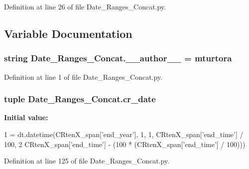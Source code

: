 Definition at line 26 of file Date\+\_\+\+Ranges\+\_\+\+Concat.\+py.



\subsection{Variable Documentation}
\hypertarget{namespace_date___ranges___concat_ac343717504128e865654d5aa6243c692}{}
\subsubsection[{\+\_\+\+\_\+author\+\_\+\+\_\+}]{\setlength{\rightskip}{0pt plus 5cm}string Date\+\_\+\+Ranges\+\_\+\+Concat.\+\_\+\+\_\+author\+\_\+\+\_\+ = \textquotesingle{}mturtora\textquotesingle{}}\label{namespace_date___ranges___concat_ac343717504128e865654d5aa6243c692}


Definition at line 1 of file Date\+\_\+\+Ranges\+\_\+\+Concat.\+py.

\hypertarget{namespace_date___ranges___concat_a539cd8f2fa606ab4b45a99ebf85cfea5}{}
\subsubsection[{cr\+\_\+date}]{\setlength{\rightskip}{0pt plus 5cm}tuple Date\+\_\+\+Ranges\+\_\+\+Concat.\+cr\+\_\+date}\label{namespace_date___ranges___concat_a539cd8f2fa606ab4b45a99ebf85cfea5}
{\bfseries Initial value\+:}
\begin{DoxyCode}
1 = dt.datetime(CRtenX\_span[\textcolor{stringliteral}{'end\_year'}], 1, 1, CRtenX\_span[\textcolor{stringliteral}{'end\_time'}] / 100,
2                               CRtenX\_span[\textcolor{stringliteral}{'end\_time'}] - (100 * (CRtenX\_span[\textcolor{stringliteral}{'end\_time'}] / 100)))
\end{DoxyCode}


Definition at line 125 of file Date\+\_\+\+Ranges\+\_\+\+Concat.\+py.

\hypertarget{namespace_date___ranges___concat_a7ef25cabc133407cacce6c54c47d4ef6}{}
